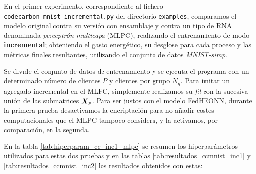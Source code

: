 \documentclass[00-Trabajo_Final.tex]{subfiles}
\begin{document}
\vspace{0.5em}

En el primer experimento, correspondiente al fichero \verb|codecarbon_mnist_incremental.py| del directorio \verb|examples|, comparamos el modelo original contra su versión con ensamblaje y contra un tipo de RNA denominada \textit{perceptrón multicapa} (MLPC), realizando el entrenamiento de modo \textbf{incremental}; obteniendo el gasto energético, su desglose para cada proceso y las métricas finales resultantes, utilizando el conjunto de datos \textit{MNIST-simp}.

\vspace{0.5em}

Se divide el conjunto de datos de entrenamiento y se ejecuta el programa con un determinado número de clientes $P$ y clientes por grupo $N_g$. Para imitar un agregado incremental en el MLPC, simplemente realizamos su \textit{fit} con la sucesiva unión de las submatrices $\boldsymbol{X}_p$. Para ser justos con el modelo FedHEONN, durante la primera prueba desactivamos la encriptación para no añadir costes computacionales que el MLPC tampoco considera, y la activamos, por comparación, en la segunda.

En la tabla \ref{tab:hiperparam_cc_inc1_mlpc} se resumen los hiperparámetros utilizados para estas dos pruebas y en las tablas \ref{tab:resultados_ccmnist_inc1} y \ref{tab:resultados_ccmnist_inc2} los resultados obtenidos con estas:
\end{document}

